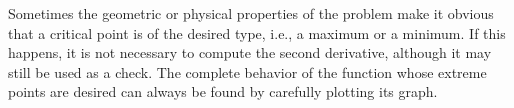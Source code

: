 Sometimes the geometric or physical properties of the problem make it obvious that a critical point is of the desired type, i.e., a maximum or a minimum. If this happens, it is not necessary to compute the second derivative, although it may still be used as a check. The complete behavior of the function whose extreme points are desired can always be found by carefully plotting its graph.


